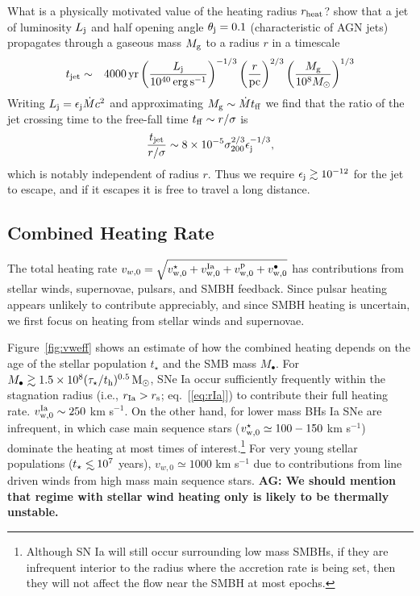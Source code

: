 \documentclass[usenatbib,fleqn]{mn2e}
\newcommand\lsim{\mathrel{\rlap{\lower4pt\hbox{\hskip1pt$\sim$}}
    \raise1pt\hbox{$<$}}}
\newcommand{\Mbh}[1][]{M_{\bullet#1}}
\newcommand{\vwO}{v_{w,0}}
\newcommand{\tage}{t_{\star}}
\begin{document}
What is a physically motivated value of the heating radius $r_{\rm heat}$?  \citet{Bromberg+11} show that a jet of luminosity $L_{\rm j}$ and half opening angle $\theta_{\rm j} = 0.1$ (characteristic of AGN jets) propagates through a gaseous mass $M_{\rm g}$ to a radius $r$ in a
timescale
\begin{eqnarray}
t_{\rm jet} &\sim& 4000\,{\rm yr}\left(\frac{{L}_{\rm j}}{10^{40}\,\rm erg\,s^{-1}}\right)^{-1/3}\left(\frac{r}{\rm pc}\right)^{2/3}\left(\frac{M_{\rm g}}{10^{8}M_{\odot}}\right)^{1/3} 
\end{eqnarray}
Writing $L_{\rm j} = \epsilon_{\rm j}\dot{M}c^{2}$ and approximating $M_{\rm g} \sim \dot{M}t_{\rm ff}$ we find that the ratio of the jet crossing time to the free-fall time $t_{\rm ff} \sim r/\sigma$ is 
\begin{equation}
\frac{t_{\rm jet}}{r/\sigma} \sim 8\times 10^{-5}\sigma_{200}^{2/3}\epsilon_{\rm j}^{-1/3},
\end{equation}
which is notably independent of radius $r$.  Thus we require $\epsilon_{\rm j} \gtrsim 10^{-12}$ for the jet to escape, and if it escapes it is free to travel a long distance. 

\subsection{Combined Heating Rate} 

The total heating rate $\vwO = \sqrt{v_{\rm w,0}^{\star} + v_{\rm w,0}^{\rm Ia} + v_{\rm w,0}^{\rm p} + v_{\rm w,0}^{\bullet}}$ has contributions from stellar winds, supernovae, pulsars, and SMBH feedback.  Since pulsar heating appears unlikely to contribute appreciably, and since SMBH heating is uncertain, we first focus on heating from stellar winds and supernovae.  

Figure~\ref{fig:vweff} shows an estimate of how the combined heating
depends on the age of the stellar population $\tage$ and the SMB mass
$\Mbh$.  For $M_{\bullet} \gtrsim 1.5\times 10^8 (\tau_{\star}/t_{\rm
  h})^{0.5} \,{\rm M_\odot}$, SNe Ia occur sufficiently frequently within the
stagnation radius (i.e., $r_{\rm Ia} > r_{\rm s}$; eq.~[\ref{eq:rIa}])
to contribute their full heating rate.  $v_{\rm w,0}^{\rm Ia} \sim
250$ km s$^{-1}$.  On the other hand, for lower mass BHs Ia SNe are
infrequent, in which case main sequence stars ($v_{\rm w,0}^{\star}
\simeq 100-150$ km s$^{-1}$) dominate the heating at most times of
interest.\footnote{Although SN Ia will still occur surrounding low
  mass SMBHs, if they are infrequent interior to the radius where the
  accretion rate is being set, then they will not affect the flow near
  the SMBH at most epochs.}  For very young stellar populations
($\tage \lsim 10^7$ years), $\vwO\simeq 1000$ km s$^{-1}$ due to
contributions from line driven winds from high mass main sequence
stars.
{\bf AG: We should mention that regime with stellar wind heating only
  is likely to be thermally unstable.}
\end{document}
